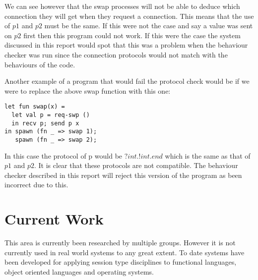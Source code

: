 We can see however that the swap processes will not be able to deduce which connection they will get when they request a connection. This means that the use of $p1$ and $p2$ must be the same. If this were not the case and say a value was sent on $p2$ first then this program could not work. If this were the case the system discussed in this report would spot that this was a problem when the behaviour checker was run since the connection protocols would not match with the behaviours of the code. 

Another example of a program that would fail the protocol check would be if we were to replace the above swap function with this one:

\begin{lstlisting}
let fun swap(x) =
  let val p = req-swp ()
  in recv p; send p x 
in spawn (fn _ => swap 1);
   spawn (fn _ => swap 2);
\end{lstlisting}

In this case the protocol of p would be $?int.!int.end$ which is the same as that of $p1$ and $p2$. It is clear that these protocols are not compatible. The behaviour checker described in this report will reject this version of the program as been incorrect due to this. 


\section{Current Work}
This area is currently been researched by multiple groups. However it is not currently used in real world systems to any great extent. To date systems have been developed for applying session type disciplines to functional languages, object oriented languages and operating systems. 

